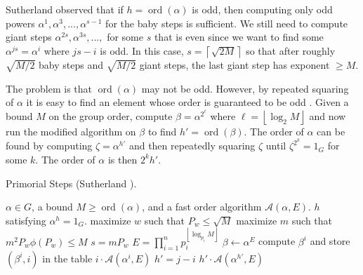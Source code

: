 \documentclass{ucalgthes1}
\theoremstyle{definition}
\DeclareMathOperator{\ord}{ord}
\newcommand{\floor}[1]{\left\lfloor #1 \right\rfloor}
\newcommand{\ceil}[1]{\left\lceil #1 \right\rceil}
\begin{document}
Sutherland observed \cite[p.56]{Sutherland2007} that if $h = \ord(\alpha)$ is odd, then computing only odd powers $\alpha^1, \alpha^3, ..., \alpha^{s-1}$ for the baby steps is sufficient.  We still need to compute giant steps $\alpha^{2s}, \alpha^{3s}, ...,$ for some $s$ that is even since we want to find some $\alpha^{js} = \alpha^i$ where $js - i$ is odd.  In this case, $s = \ceil{\sqrt{2M}}$ so that after roughly $\sqrt{M/2}$ baby steps and $\sqrt{M/2}$ giant steps, the last giant step has exponent $\ge M$.

The problem is that $\ord(\alpha)$ may not be odd.  However, by repeated squaring of $\alpha$ it is easy to find an element whose order is guaranteed to be odd \cite[p.56]{Sutherland2007}.  Given a bound $M$ on the group order, compute $\beta = \alpha^{2^\ell}$ where $\ell = \floor{\log_2 M}$ and now run the modified algorithm on $\beta$ to find $h' = \ord(\beta)$.  The order of $\alpha$ can be found by computing $\zeta = \alpha^{h'}$ and then repeatedly squaring $\zeta$ until $\zeta^{2^k} = 1_G$ for some $k$.  The order of $\alpha$ is then $2^k h'$.

\begin{algorithm}[htb]
\caption{Primorial Steps (Sutherland \cite[p.57]{Sutherland2007}).}
\label{alg:primorialSteps}
\begin{algorithmic}[1]
\Require $\alpha \in G$, a bound $M \ge \ord(\alpha)$, and a fast order algorithm $\mathcal A(\alpha, E)$.
\Ensure $h$ satisfying $\alpha ^ h = 1_G$.
\State maximize $w$ such that $P_w \le \sqrt{M}$
\State maximize $m$ such that $m^2P_w\phi(P_w) \le M$
\State $s = mP_w$
\State $E = \prod_{i=1}^n p_i^{\floor{\log_{p_i} M}}$
\State $\beta \gets \alpha^E$
	\State compute $\beta^i$ and store $(\beta^i, i)$ in the table 
		\State \Return $i \cdot \mathcal A(\alpha^i, E)$
	\EndIf
\EndFor
{}
	 
		\State $h' = j - i$
		\State \Return $h' \cdot \mathcal A(\alpha^{h'}, E)$
	\EndIf
\EndFor
\end{algorithmic}
\end{algorithm}
\end{document}
